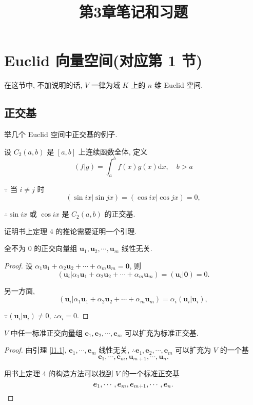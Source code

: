 \documentclass[color=black,device=normal,lang=cn,mode=geye]{elegantnote}
\title{第3章笔记和习题}
\begin{document}
\maketitle
\section{Euclid 向量空间(对应第 1 节)}
在这节中, 不加说明的话, $V$ 一律为域 $K$ 上的 $n$ 维 Euclid 空间.
\subsection{正交基}
举几个 Euclid 空间中正交基的例子.
\begin{example}
    设 $C_2(a,b)$ 是 $[a,b]$ 上连续函数全体, 定义
    \[(f|g)=\int_a^bf(x)g(x)\mathrm{d}x,\quad b>a\]

    $\because$ 当 $i\neq j$ 时
    \[(\sin ix|\sin jx)=(\cos ix|\cos jx)=0,\]

    $\therefore\sin ix$ 或 $\cos ix$ 是 $C_2(a,b)$ 的正交基.
\end{example}
证明书上定理 4 的推论需要证明一个引理.
\begin{lemma}\label{l1.1}
    全不为 $0$ 的正交向量组 $\boldsymbol{u}_1,\boldsymbol{u}_2,\cdots,\boldsymbol{u}_m$ 线性无关.
\end{lemma}
\begin{proof}
    设 $\alpha_1\boldsymbol{u}_1+\alpha_2\boldsymbol{u}_2+\cdots+\alpha_m\boldsymbol{u}_m=\boldsymbol{0}$, 则
    \[(\boldsymbol{u}_i|\alpha_1\boldsymbol{u}_1+\alpha_2\boldsymbol{u}_2+\cdots+\alpha_m\boldsymbol{u}_m)=(\boldsymbol{u}_i|\boldsymbol{0})=0.\]

    另一方面,
    \[(\boldsymbol{u}_i|\alpha_1\boldsymbol{u}_1+\alpha_2\boldsymbol{u}_2+\cdots+\alpha_m\boldsymbol{u}_m)=\alpha_i(\boldsymbol{u}_i|\boldsymbol{u}_i),\]
    
    $\because(\boldsymbol{u}_i|\boldsymbol{u}_i)\neq0$, $\therefore\alpha_i=0$.
\end{proof}
\begin{theorem}
    $V$ 中任一标准正交向量组 $\boldsymbol{e}_1,\boldsymbol{e}_2,\cdots,\boldsymbol{e}_m$ 可以扩充为标准正交基.
\end{theorem}
\begin{proof}
    由引理 \ref{l1.1}, $\boldsymbol{e}_1,\cdots,\boldsymbol{e}_m$ 线性无关, $\therefore\boldsymbol{e}_1,\boldsymbol{e}_2,\cdots,\boldsymbol{e}_m$ 可以扩充为 $V$ 的一个基
    \[\boldsymbol{e}_1,\cdots,\boldsymbol{e}_m,\boldsymbol{u}_{m+1},\cdots,\boldsymbol{u}_n.\]
    
    用书上定理 4 的构造方法可以找到 $V$ 的一个标准正交基
    \[\boldsymbol{e}_1,\cdots,\boldsymbol{e}_m,\boldsymbol{e}_{m+1},\cdots,\boldsymbol{e}_n.\qedhere\]
\end{proof}
\end{document}
